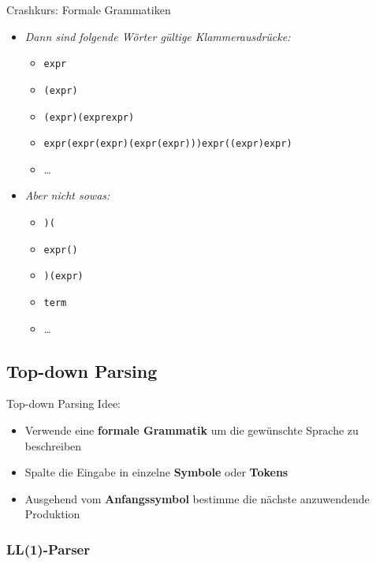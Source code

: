 \documentclass[18pt]{beamer}
\begin{document}
\begin{frame}{Crashkurs: Formale Grammatiken}
    \begin{itemize}
        \item \textit{Dann sind folgende Wörter gültige Klammerausdrücke:}
        \begin{itemize}
            \item \texttt{expr}
            \item \texttt{(expr)}
            \item \texttt{(expr)(exprexpr)}
            \item \texttt{expr(expr(expr)(expr(expr)))expr((expr)expr)}
            \item \dots
        \end{itemize}
        \item \textit{Aber nicht sowas:}
        \begin{itemize}
            \item \texttt{)(}
            \item \texttt{expr()}
            \item \texttt{)(expr)}
            \item \texttt{term}
            \item \dots
        \end{itemize}
    \end{itemize}
\end{frame}

\subsection{Top-down Parsing}

\begin{frame}{Top-down Parsing}
    Idee:\\
    \begin{itemize}
        \item Verwende eine \textbf{formale Grammatik} um die gewünschte Sprache zu beschreiben
        \item Spalte die Eingabe in einzelne \textbf{Symbole} oder \textbf{Tokens}
        \item Ausgehend vom \textbf{Anfangssymbol} bestimme die nächste anzuwendende Produktion
    \end{itemize}
\end{frame}

\subsubsection{LL(1)-Parser}
\end{document}
